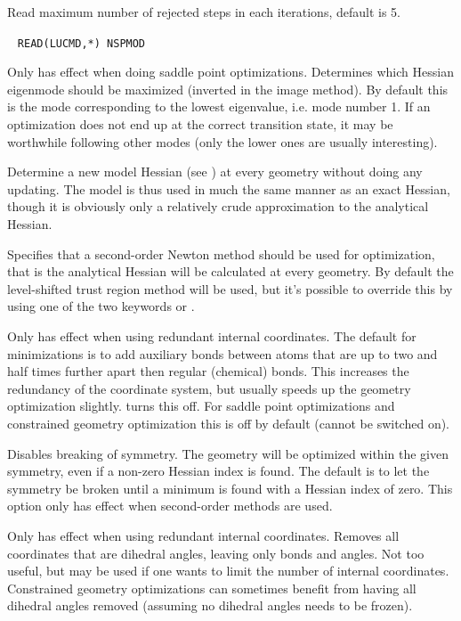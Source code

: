\begin{description}
Read maximum number of rejected steps in
each iterations, default is 5.

\item[\Key{MODE}]\verb| |
\newline
\verb|READ(LUCMD,*) NSPMOD|

Only has effect when doing saddle point optimizations. Determines
which Hessian eigenmode should be maximized (inverted in the image
method). By default this is the mode corresponding to the lowest
eigenvalue, i.e. mode number 1. If an optimization does not end up at
the correct transition state, it may be worthwhile following other modes
(only the lower ones are usually interesting).

\item[\Key{MODHES}]
Determine a new model Hessian (see )
at every geometry without doing any updating. The model is thus used
in much the same manner as an exact Hessian, though it is obviously
only a relatively crude approximation to the analytical Hessian.

\item[\Key{NEWTON}]
Specifies that a second-order Newton method should be used for
optimization, that is the analytical Hessian will be calculated at
every geometry. By default the level-shifted trust region method will
be used, but it's possible to override this by using one of the two
keywords  or .

\item[\Key{NOAUX}]
Only has effect when using redundant internal coordinates. The default
for minimizations is to add auxiliary bonds between atoms that are up
to two and half times further apart then regular (chemical)
bonds. This increases the redundancy of the coordinate system, but
usually speeds up the geometry optimization slightly. 
turns this off. For saddle point optimizations and constrained
geometry optimization this is off by default (cannot be switched on).

\item[\Key{NOBREA}]
Disables breaking of symmetry. The geometry will
be optimized within the given symmetry, even if a non-zero Hessian
index is found. The default is to let the symmetry be broken until
a minimum is found with a Hessian index of
zero. This option only has effect when second-order methods are used.

\item[\Key{NODIHE}]
Only has effect when using redundant internal coordinates. Removes all
coordinates that are dihedral angles, leaving only bonds and
angles. Not too useful, but may be used if one wants to limit the
number of internal coordinates. Constrained geometry optimizations can
sometimes benefit from having all dihedral angles removed (assuming no
dihedral angles needs to be frozen).


\end{description}
